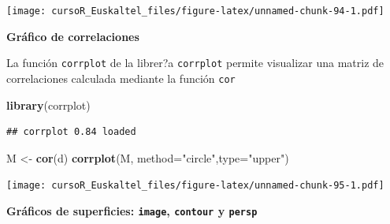 \documentclass[]{book}
\newenvironment{Shaded}{\begin{snugshade}}{\end{snugshade}}
\newcommand{\KeywordTok}[1]{\textcolor[rgb]{0.13,0.29,0.53}{\textbf{#1}}}
\newcommand{\DataTypeTok}[1]{\textcolor[rgb]{0.13,0.29,0.53}{#1}}
\newcommand{\DecValTok}[1]{\textcolor[rgb]{0.00,0.00,0.81}{#1}}
\newcommand{\StringTok}[1]{\textcolor[rgb]{0.31,0.60,0.02}{#1}}
\newcommand{\OtherTok}[1]{\textcolor[rgb]{0.56,0.35,0.01}{#1}}
\newcommand{\OperatorTok}[1]{\textcolor[rgb]{0.81,0.36,0.00}{\textbf{#1}}}
\newcommand{\NormalTok}[1]{#1}
\begin{document}
\texttt{[image: cursoR\_Euskaltel\_files/figure-latex/unnamed-chunk-94-1.pdf]}

\textbf{Gráfico de correlaciones}

La función \texttt{corrplot} de la librer?a \texttt{corrplot} permite
visualizar una matriz de correlaciones calculada mediante la función
\texttt{cor}

\begin{Shaded}
\begin{Highlighting}[]
\KeywordTok{library}\NormalTok{(corrplot)}
\end{Highlighting}
\end{Shaded}

\begin{verbatim}
## corrplot 0.84 loaded
\end{verbatim}

\begin{Shaded}
\begin{Highlighting}[]
\NormalTok{M <-}\StringTok{ }\KeywordTok{cor}\NormalTok{(d)}
\KeywordTok{corrplot}\NormalTok{(M, }\DataTypeTok{method=}\StringTok{"circle"}\NormalTok{,}\DataTypeTok{type=}\StringTok{"upper"}\NormalTok{)}
\end{Highlighting}
\end{Shaded}

\texttt{[image: cursoR\_Euskaltel\_files/figure-latex/unnamed-chunk-95-1.pdf]}

\textbf{Gráficos de superficies: \texttt{image}, \texttt{contour} y
\texttt{persp}}

\begin{Shaded}
\end{Shaded}
\end{document}
